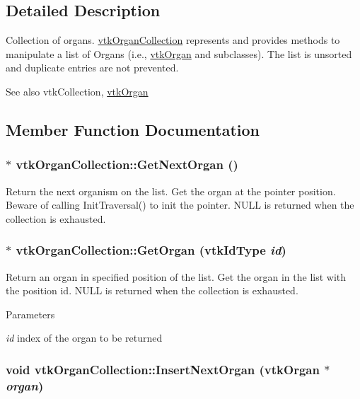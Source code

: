 \subsection{Detailed Description}
Collection of organs. \hyperlink{classvtkOrganCollection}{vtkOrganCollection} represents and provides methods to manipulate a list of Organs (i.e., \hyperlink{classvtkOrgan}{vtkOrgan} and subclasses). The list is unsorted and duplicate entries are not prevented. \begin{DoxySeeAlso}{See also}
vtkCollection, \hyperlink{classvtkOrgan}{vtkOrgan} 
\end{DoxySeeAlso}


\subsection{Member Function Documentation}
\hypertarget{classvtkOrganCollection_a6c938a8313d037d6f3298b535c09381d}{
\subsubsection[{GetNextOrgan}]{ $\ast$ vtkOrganCollection::GetNextOrgan ()}}
\label{classvtkOrganCollection_a6c938a8313d037d6f3298b535c09381d}


Return the next organism on the list. Get the organ at the pointer position. Beware of calling InitTraversal() to init the pointer. NULL is returned when the collection is exhausted. \hypertarget{classvtkOrganCollection_aa5257cc112516992a222c4cdf4e72003}{
\subsubsection[{GetOrgan}]{ $\ast$ vtkOrganCollection::GetOrgan (vtkIdType {\em id})}}
\label{classvtkOrganCollection_aa5257cc112516992a222c4cdf4e72003}


Return an organ in specified position of the list. Get the organ in the list with the position id. NULL is returned when the collection is exhausted. 
\begin{DoxyParams}{Parameters}
\item[{\em id}]index of the organ to be returned \end{DoxyParams}
\hypertarget{classvtkOrganCollection_abf0d197e67a3d97b38b35a149585a361}{
\subsubsection[{InsertNextOrgan}]{\setlength{\rightskip}{0pt plus 5cm}void vtkOrganCollection::InsertNextOrgan ({\bf vtkOrgan} $\ast$ {\em organ})}}
\label{classvtkOrganCollection_abf0d197e67a3d97b38b35a149585a361}


